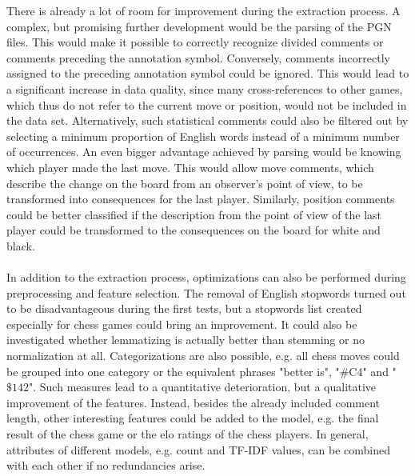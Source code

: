 \documentclass[article,type=msc,colorback,accentcolor=tud7b]{tudthesis}
\begin{document}
    There is already a lot of room for improvement during the extraction process. A complex, but promising further development would be the parsing of the PGN files. This would make it possible to correctly recognize divided comments or comments preceding the annotation symbol. Conversely, comments incorrectly assigned to the preceding annotation symbol could be ignored. This would lead to a significant increase in data quality, since many cross-references to other games, which thus do not refer to the current move or position, would not be included in the data set. Alternatively, such statistical comments could also be filtered out by selecting a minimum proportion of English words instead of a minimum number of occurrences. An even bigger advantage achieved by parsing would be knowing which player made the last move. This would allow move comments, which describe the change on the board from an observer's point of view, to be transformed into consequences for the last player. Similarly, position comments could be better classified if the description from the point of view of the last player could be transformed to the consequences on the board for white and black. \\\\
    In addition to the extraction process, optimizations can also be performed during preprocessing and feature selection. The removal of English stopwords turned out to be disadvantageous during the first tests, but a stopwords list created especially for chess games could bring an improvement. It could also be investigated whether lemmatizing is actually better than stemming or no normalization at all. Categorizations are also possible, e.g. all chess moves could be grouped into one category or the equivalent phrases "better is", "\#C4" and "$\$142$". Such measures lead to a quantitative deterioration, but a qualitative improvement of the features. Instead, besides the already included comment length, other interesting features could be added to the model, e.g. the final result of the chess game or the elo ratings of the chess players. In general, attributes of different models, e.g. count and TF-IDF values, can be combined with each other if no redundancies arise. \\\\
\end{document}
